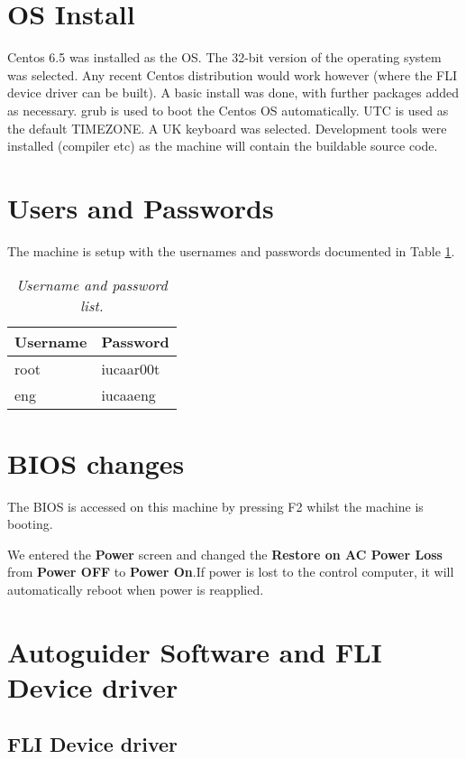 \documentclass[10pt,a4paper]{article}
\begin{document}
\section{OS Install}
Centos 6.5 was installed as the OS. The 32-bit version of the operating system was selected. Any recent Centos distribution would work however (where the FLI device driver can be built). A basic install was done, with further packages added as necessary. grub is used to boot the Centos OS automatically. UTC is used as the default TIMEZONE. A UK keyboard was selected. Development tools were installed (compiler etc) as the machine will contain the buildable source code.

\section{Users and Passwords}

The machine is setup with the usernames and passwords documented in Table \ref{tab:usernamespasswords}.

\begin{table}[!h]
\begin{center}
\begin{tabular}{|l|l|}
\hline
{\bf Username} & {\bf Password} \\ \hline
root & iucaar00t \\ \hline
eng & iucaaeng \\ \hline
\end{tabular}
\end{center}
\caption{\em Username and password list.}
\label{tab:usernamespasswords}
\end{table}

\section{BIOS changes}

The BIOS is accessed on this machine by pressing F2 whilst the machine is booting.

We entered the {\bf Power} screen and changed the {\bf Restore on AC Power Loss} from {\bf Power OFF} to {\bf Power On}.If power is lost to the control computer, it will automatically reboot when power is reapplied.

\section{Autoguider Software and FLI Device driver}

\subsection{FLI Device driver}
\end{document}

